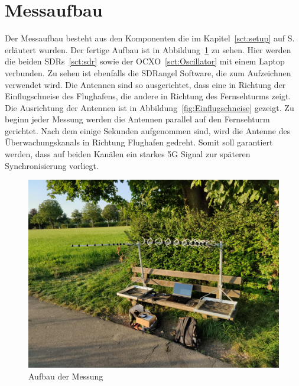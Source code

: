 \section{Messaufbau}

Der Messaufbau besteht aus den Komponenten die im Kapitel~\ref{sct:setup} auf S.~\pageref{sct:setup} erläutert wurden. Der fertige Aufbau ist in Abbildung~\ref{fig:Messaufbau} zu sehen. Hier werden die beiden SDRs~\ref{sct:sdr} sowie der OCXO~\ref{sct:Oscillator} mit einem Laptop verbunden. Zu sehen ist ebenfalls die SDRangel Software, die zum Aufzeichnen verwendet wird. Die Antennen sind so ausgerichtet, dass eine in Richtung der Einflugschneise des Flughafens, die andere in Richtung des Fernsehturms zeigt. Die Ausrichtung der Antennen ist in Abbildung~\ref{fig:Einflugschneise} gezeigt. Zu beginn jeder Messung werden die Antennen parallel auf den Fernsehturm gerichtet. Nach dem einige Sekunden aufgenommen sind, wird die Antenne des Überwachungskanals in Richtung Flughafen gedreht. Somit soll garantiert werden, dass auf beiden Kanälen ein starkes 5G Signal zur späteren Synchronisierung vorliegt.

\begin{figure}
    \centering
    \includegraphics[width=\textwidth]{images/Messaufbau.jpg}
    \caption{Aufbau der Messung}\label{fig:Messaufbau}
\end{figure}
